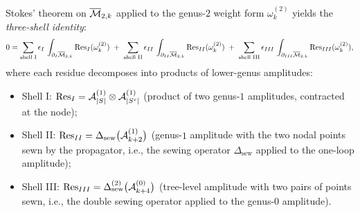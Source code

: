 \begin{theorem}
\label{thm:thqg-bv-ext-three-shell}
Stokes' theorem on $\overline{\mathcal{M}}_{2,k}$ applied to the genus-$2$
weight form $\omega^{(2)}_k$ yields the \emph{three-shell identity}:
\begin{equation}
0 = \sum_{\text{shell I}} \epsilon_I\,
\int_{\partial_I \overline{\mathcal{M}}_{2,k}}
\operatorname{Res}_I(\omega^{(2)}_k)
\;+\; \sum_{\text{shell II}} \epsilon_{II}\,
\int_{\partial_{II} \overline{\mathcal{M}}_{2,k}}
\operatorname{Res}_{II}(\omega^{(2)}_k)
\;+\; \sum_{\text{shell III}} \epsilon_{III}\,
\int_{\partial_{III} \overline{\mathcal{M}}_{2,k}}
\operatorname{Res}_{III}(\omega^{(2)}_k),
\end{equation}
where each residue decomposes into products of lower-genus
amplitudes:
\begin{itemize}
\item Shell I: $\operatorname{Res}_I = \mathcal{A}_{|S|}^{(1)} \otimes
 \mathcal{A}_{|S^c|}^{(1)}$ (product of two genus-$1$ amplitudes,
 contracted at the node);
\item Shell II: $\operatorname{Res}_{II} = \Delta_{\mathrm{sew}}\bigl(
 \mathcal{A}_{k+2}^{(1)}\bigr)$ (genus-$1$ amplitude with the two
 nodal points sewn by the propagator, i.e., the sewing
 operator $\Delta_{\mathrm{sew}}$ applied to the one-loop
 amplitude);
\item Shell III: $\operatorname{Res}_{III} = \Delta_{\mathrm{sew}}^{(2)}\bigl(
 \mathcal{A}_{k+4}^{(0)}\bigr)$ (tree-level amplitude with two pairs
 of points sewn, i.e., the double sewing operator applied to
 the genus-$0$ amplitude).
\end{itemize}
\end{theorem}

